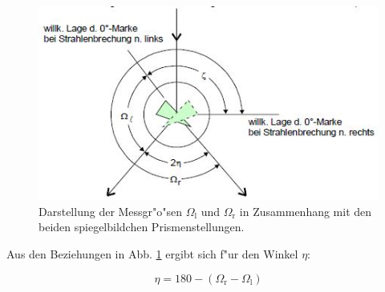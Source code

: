 	\begin{figure}[!h]
		\centering
		\includegraphics[width = 12cm]{img/omega.JPG}
		\caption{Darstellung der Messgr"o"sen $\Omega_\mathrm{l}$ und $\Omega_\mathrm{r}$ in Zusammenhang mit den beiden spiegelbildchen Prismenstellungen. \cite{anleitung}}
		\label{omega}
	\end{figure}

	Aus den Beziehungen in Abb. \ref{omega} ergibt sich f"ur den Winkel $\eta$:

	\begin{equation}
		\eta = 180 - (\Omega_\mathrm{r} - \Omega_\mathrm{l}) \label{eqn:eta}
	\end{equation}